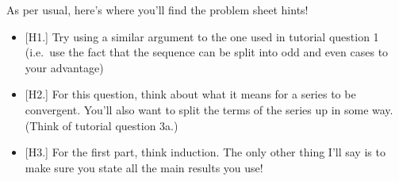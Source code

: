 \documentclass[
  10pt,
  a4paper]{article}
\providecommand{\tightlist}{%
  \setlength{\itemsep}{0pt}\setlength{\parskip}{0pt}}
\theoremstyle{plain}
\theoremstyle{plain}
\theoremstyle{plain}
\theoremstyle{plain}
\theoremstyle{plain}
\theoremstyle{definition}
\theoremstyle{definition}
\theoremstyle{definition}
\theoremstyle{remark}
\begin{document}
As per usual, here's where you'll find the problem sheet hints!

\begin{itemize}
\tightlist
\item
  {[}H1.{]} Try using a similar argument to the one used in tutorial question 1 (i.e.~use the fact that the sequence can be split into odd and even cases to your advantage)
\item
  {[}H2.{]} For this question, think about what it means for a series to be convergent. You'll also want to split the terms of the series up in some way. (Think of tutorial question 3a.)
\item
  {[}H3.{]} For the first part, think induction. The only other thing I'll say is to make sure you state all the main results you use!
\end{itemize}
\end{document}
